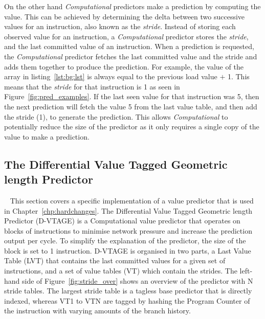 
On the other hand \textit{Computational} predictors make a prediction by computing the value.
This can be achieved by determining the delta between two successive values for an instruction, also known as the \textit{stride}.
Instead of storing each observed value for an instruction, a \textit{Computational} predictor stores the \textit{stride}, and the last committed value of an instruction.
When a prediction is requested, the \textit{Computational} predictor fetches the last committed value and the stride and adds them together to produce the prediction.
For example, the value of the array in listing~\ref{lst:bg:lst} is always equal to the previous load value $+$ 1.
This means that the \textit{stride} for that instruction is 1 as seen in Figure~\ref{fig:pred_examples}.
If the last seen value for that instruction was 5, then the next prediction will fetch the value 5 from the last value table, and then add the stride (1), to generate the prediction.
This allows \textit{Computational} to potentially reduce the size of the predictor as it only requires a single copy of the value to make a prediction. 
\vspace{-1em}
\subsection{The Differential Value Tagged Geometric length Predictor}~\label{chp:bck:vtage}
This section covers a specific implementation of a value predictor that is used in Chapter~\ref{chp:hardchanges}.
The Differential Value Tagged Geometric length Predictor (D-VTAGE) \cite{peraisBeBop2015} is a Computational value predictor that operates on blocks of instructions to minimise network pressure and increase the prediction output per cycle.
To simplify the explanation of the predictor, the size of the block is set to 1 instruction.
D-VTAGE is organised in two parts, a Last Value Table (LVT) that contains the last committed values for a given set of instructions, and a set of value tables (VT) which contain the strides.
The left-hand side of Figure~\ref{fig:stride_over} shows an overview of the predictor with N stride tables.
The largest stride table is a tagless base predictor that is directly indexed, whereas VT1 to VTN are tagged by hashing the Program Counter of the instruction with varying amounts of the branch history.

